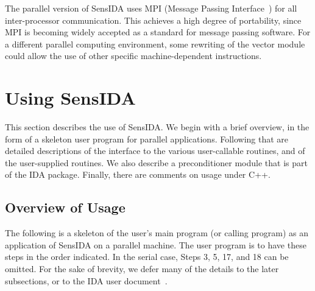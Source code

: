 The parallel version of SensIDA uses MPI (Message Passing
Interface~\cite{MPI}) for all inter-processor communication. 
This achieves a high degree of portability, since MPI is becoming
widely accepted as a standard for message passing software.
For a different parallel computing environment, some rewriting of the
vector module could allow the use of other specific machine-dependent
instructions.

\section{Using SensIDA}

This section describes the use of SensIDA.
We begin with a brief overview, in the form of a skeleton user
program for parallel applications.
Following that are detailed descriptions of the interface to the
various user-callable routines, and of the user-supplied routines.
We also describe a preconditioner module that is part of the IDA package.
Finally, there are comments on usage under C++.

\subsection{Overview of Usage}
\label{Usage}

The following is a skeleton of the user's main program (or calling
program) as an application of SensIDA on a parallel machine.
The user program is to have these steps in the order indicated.
In the serial case, Steps 3, 5, 17, and 18 can be omitted.
For the sake of brevity, we defer many of the details to the later
subsections, or to the IDA user document~\cite{IDA_UG}.

